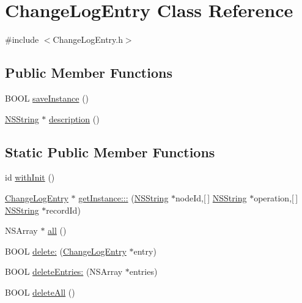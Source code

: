 \hypertarget{interface_change_log_entry}{
\section{\-Change\-Log\-Entry \-Class \-Reference}
\label{interface_change_log_entry}
}


{\ttfamily \#include $<$\-Change\-Log\-Entry.\-h$>$}

\subsection*{\-Public \-Member \-Functions}
\begin{DoxyCompactItemize}
\item 
\-B\-O\-O\-L \hyperlink{interface_change_log_entry_a9395625a4d521e17efb8ca46669d50c1}{save\-Instance} ()
\item 
\hyperlink{class_n_s_string}{\-N\-S\-String} $\ast$ \hyperlink{interface_change_log_entry_a7c7d145fda130fbddf245d5de3b2b7d5}{description} ()
\end{DoxyCompactItemize}
\subsection*{\-Static \-Public \-Member \-Functions}
\begin{DoxyCompactItemize}
\item 
id \hyperlink{interface_change_log_entry_a727fd3f9e2c54e11ccb89aaa54b90a2c}{with\-Init} ()
\item 
\hyperlink{interface_change_log_entry}{\-Change\-Log\-Entry} $\ast$ \hyperlink{interface_change_log_entry_a76b9984ca6098087fd398687faefddc6}{get\-Instance\-:::} (\hyperlink{class_n_s_string}{\-N\-S\-String} $\ast$node\-Id,\mbox{[}$\,$\mbox{]} \hyperlink{class_n_s_string}{\-N\-S\-String} $\ast$operation,\mbox{[}$\,$\mbox{]} \hyperlink{class_n_s_string}{\-N\-S\-String} $\ast$record\-Id)
\item 
\-N\-S\-Array $\ast$ \hyperlink{interface_change_log_entry_a27479d2824c718b9cfb1e403aa65c8a6}{all} ()
\item 
\-B\-O\-O\-L \hyperlink{interface_change_log_entry_ad378791d9950baa91456636934577045}{delete\-:} (\hyperlink{interface_change_log_entry}{\-Change\-Log\-Entry} $\ast$entry)
\item 
\-B\-O\-O\-L \hyperlink{interface_change_log_entry_a2dc7605fbe40f13d81d928476b58a1b7}{delete\-Entries\-:} (\-N\-S\-Array $\ast$entries)
\item 
\-B\-O\-O\-L \hyperlink{interface_change_log_entry_a30c171361954d538145de4756f4351be}{delete\-All} ()
\end{DoxyCompactItemize}
